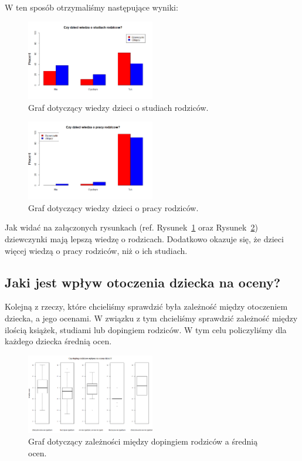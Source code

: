 \documentclass[conference]{IEEEtran}
\begin{document}
W ten sposób otrzymaliśmy następujące wyniki:

\begin{figure}
	\centering
	\includegraphics[width=0.5\textwidth]{1.png}
	\caption{Graf dotyczący wiedzy dzieci o studiach rodziców.}
	\label{fig:studies_knowledge}
\end{figure}
\begin{figure}
	\centering
	\includegraphics[width=0.5\textwidth]{2.png}
	\caption{Graf dotyczący wiedzy dzieci o pracy rodziców.}
	\label{fig:work_knowledge}
\end{figure}

Jak widać na załączonych rysunkach (ref. Rysunek~\ref{fig:studies_knowledge} oraz Rysunek~\ref{fig:work_knowledge}) dziewczynki mają lepszą wiedzę o rodzicach. Dodatkowo okazuje się, że dzieci więcej wiedzą o pracy rodziców, niż o ich studiach.

\subsection{Jaki jest wpływ otoczenia dziecka na oceny?}
Kolejną z rzeczy, które chcieliśmy sprawdzić była zależność między otoczeniem dziecka, a jego ocenami. W związku z tym chcieliśmy sprawdzić zależność między ilością książek, studiami lub dopingiem rodziców. W tym celu policzyliśmy dla każdego dziecka średnią ocen.

\begin{figure}
	\centering
	\includegraphics[width=0.5\textwidth]{3.png}
	\caption{Graf dotyczący zależności między dopingiem rodziców a  średnią ocen.}
	\label{fig:doping_oceny}
\end{figure}
\end{document}
